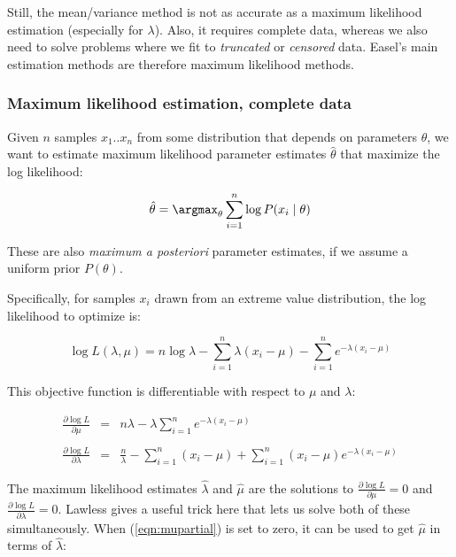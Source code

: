 Still, the mean/variance method is not as accurate as a maximum
likelihood estimation (especially for $\lambda$). Also, it requires
complete data, whereas we also need to solve problems where we fit to
\emph{truncated} or \emph{censored} data. Easel's main estimation
methods are therefore maximum likelihood methods.

\subsubsection{Maximum likelihood estimation, complete data}

Given $n$ samples $x_1..x_n$ from some distribution that depends on
parameters $\theta$, we want to estimate maximum likelihood parameter
estimates $\hat{\theta}$ that maximize the log likelihood:

\[
   \hat{\theta} = \argmax_{\theta} \sum_{i=1}^{n} \log P(x_i \mid \theta)
\]

These are also \emph{maximum a posteriori} parameter estimates, if we
assume a uniform prior $P(\theta)$.

Specifically, for samples $x_i$ drawn from an extreme value
distribution, the log likelihood to optimize is:

\begin{equation}
\log L(\lambda, \mu) = n \log \lambda - \sum_{i=1}^{n} \lambda(x_i -
\mu) - \sum_{i=1}^{n} e^{-\lambda(x_i - \mu)}
\label{eqn:logL}
\end{equation}

This objective function is differentiable with respect to $\mu$ and
$\lambda$:

\begin{eqnarray}
\frac{\partial \log L}{\partial \mu} & = &
n \lambda - \lambda \sum_{i=1}^{n} e^{-\lambda (x_i - \mu)}\\%
\\%
\label{eqn:mupartial}
\frac{\partial \log L}{\partial \lambda} & = &
\frac{n}{\lambda} - \sum_{i=1}^{n} (x_i - \mu) +  
\sum_{i=1}^{n} (x_i - \mu) e^{-\lambda (x_i - \mu)}
\label{eqn:lambdapartial}
\end{eqnarray}

The maximum likelihood estimates $\hat{\lambda}$ and $\hat{\mu}$ are
the solutions to $\frac{\partial \log L}{\partial \mu} = 0$ and
$\frac{\partial \log L}{\partial \lambda} = 0$. Lawless
\citep{Lawless82} gives a useful trick here that lets us solve both of
these simultaneously. When (\ref{eqn:mupartial}) is set to zero, it
can be used to get $\hat{\mu}$ in terms of $\hat{\lambda}$:


